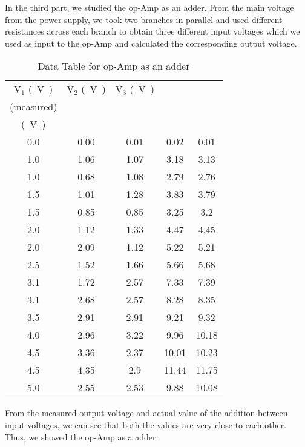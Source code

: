 \documentclass{scrartcl}
\begin{document}
\noindent
In the third part, we studied the op-Amp as an adder. From the main voltage from the power supply, we took two branches in parallel and used different resistances across each branch to obtain three different input voltages which we used as input to the op-Amp and calculated the corresponding output voltage.


\begin{table}[H]
    \centering
    \begin{tabular}{|c|c|c|c|c|}
    \hline
    $\mathrm{V_1}$ \si{(V)} & $\mathrm{V_2}$ \si{(V)} & $\mathrm{V_3}$ \si{(V)} & \thead{$\mathrm{V_{\text{out}}}\si{(V)}$\\ (measured)} & \thead{$\mathrm{V_1} +\mathrm{V_2}+\mathrm{V_3} $ \\ \si{(V)}} \\ \hline
    0.0    & 0.00    & 0.01 & 0.02 & 0.01 \\ \hline
    1.0    & 1.06 & 1.07 & 3.18 & 3.13 \\ \hline
    1.0    & 0.68 & 1.08 & 2.79 & 2.76 \\ \hline
    1.5  & 1.01 & 1.28 & 3.83 & 3.79 \\ \hline
    1.5  & 0.85 & 0.85 & 3.25 & 3.2  \\ \hline
    2.0    & 1.12 & 1.33 & 4.47 & 4.45 \\ \hline
    2.0    & 2.09 & 1.12 & 5.22 & 5.21 \\ \hline
    2.5  & 1.52 & 1.66 & 5.66 & 5.68 \\ \hline
    3.1  & 1.72 & 2.57 & 7.33 & 7.39 \\ \hline
    3.1  & 2.68 & 2.57 & 8.28 & 8.35 \\ \hline
    3.5  & 2.91 & 2.91 & 9.21 & 9.32 \\ \hline
    4.0    & 2.96 & 3.22 & 9.96 & 10.18 \\ \hline
    4.5  & 3.36 & 2.37 & 10.01 & 10.23 \\ \hline
    4.5  & 4.35 & 2.9  & 11.44 & 11.75 \\ \hline
    5.0    & 2.55 & 2.53 & 9.88 & 10.08 \\ \hline
    \end{tabular}
    \caption{Data Table for op-Amp as an adder}
    \label{tab:voltage_measurements}
    \end{table}
    \noindent
    From the measured output voltage and actual value of the addition between input voltages, we can see that both the values are very close to each other. Thus, we showed the op-Amp as a adder.
    \noindent\\[0.4cm]
\end{document}

